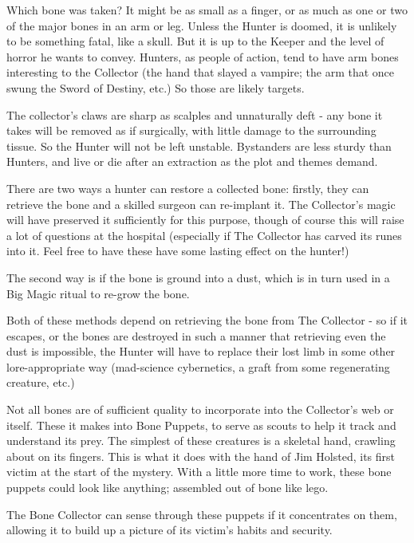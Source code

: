 \documentclass{motw}
\begin{document}

Which bone was taken?  It might be as small as a finger, or as much as one or two of the major bones in an arm or leg.  Unless the Hunter is doomed, it is unlikely to be something fatal, like a skull. But it is up to the Keeper and the level of horror he wants to convey.  Hunters, as people of action, tend to have arm bones interesting to the Collector (the hand that slayed a vampire; the arm that once swung the Sword of Destiny, etc.) So those are likely targets.

The collector's claws are sharp as scalples and unnaturally deft - any bone it takes will be removed as if surgically, with little damage to the surrounding tissue.  So the Hunter will not be left unstable.  Bystanders are less sturdy than Hunters, and live or die after an extraction as the plot and themes demand.

There are two ways a hunter can restore a collected bone: firstly, they can retrieve the bone and a skilled surgeon can re-implant it.  The Collector's magic will have preserved it sufficiently for this purpose, though of course this will raise a lot of questions at the hospital (especially if The Collector has carved its runes into it.  Feel free to have these have some lasting effect on the hunter!)

The second way is if the bone is ground into a dust, which is in turn used in a Big Magic ritual to re-grow the bone.

Both of these methods depend on retrieving the bone from The Collector - so if it escapes, or the bones are destroyed in such a manner that retrieving even the dust is impossible, the Hunter will have to replace their lost limb in some other lore-appropriate way (mad-science cybernetics, a graft from some regenerating creature, etc.)


Not all bones are of sufficient quality to incorporate into the Collector's web or itself.  These it makes into Bone Puppets, to serve as scouts to help it track and understand its prey.  The simplest of these creatures is a skeletal hand, crawling about on its fingers. This is what it does with the hand of Jim Holsted, its first victim at the start of the mystery.  With a little more time to work, these bone puppets could look like anything; assembled out of bone like lego. 

The Bone Collector can sense through these puppets if it concentrates on them, allowing it to build up a picture of its victim's habits and security.
\end{document}
